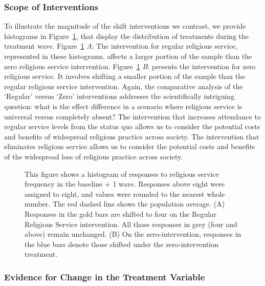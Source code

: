 \documentclass[
  single column]{article}
\begin{document}
\subsubsection{Scope of Interventions}\label{scope-of-interventions}

To illustrate the magnitude of the shift interventions we contrast, we
provide histograms in Figure~\ref{fig-hist}, that display the
distribution of treatments during the treatment wave.
Figure~\ref{fig-hist} \emph{A}: The intervention for regular religious
service, represented in these histograms, affects a larger portion of
the sample than the zero religious service intervention.
Figure~\ref{fig-hist} \emph{B}: presents the intervention for zero
religious service. It involves shifting a smaller portion of the sample
than the regular religious service intervention. Again, the comparative
analysis of the `Regular' versus `Zero' interventions addresses the
scientifically intriguing question: what is the effect difference in a
scenario where religious service is universal versus completely absent?
The intervention that increases attendance to regular service levels
from the status quo allows us to consider the potential costs and
benefits of widespread religious practice across society. The
intervention that eliminates religious service allows us to consider the
potential costs and benefits of the widespread loss of religious
practice across society.

\begin{figure}


\caption{\label{fig-hist}This figure shows a histogram of responses to
religious service frequency in the baseline + 1 wave. Responses above
eight were assigned to eight, and values were rounded to the nearest
whole number. The red dashed line shows the population average. (A)
Responses in the gold bars are shifted to four on the Regular Religious
Service intervention. All those responses in grey (four and above)
remain unchanged. (B) On the zero-intervention, responses in the blue
bars denote those shifted under the zero-intervention treatment.}

\end{figure}%

\newpage{}

\subsubsection{Evidence for Change in the Treatment
Variable}\label{evidence-for-change-in-the-treatment-variable}
\end{document}
